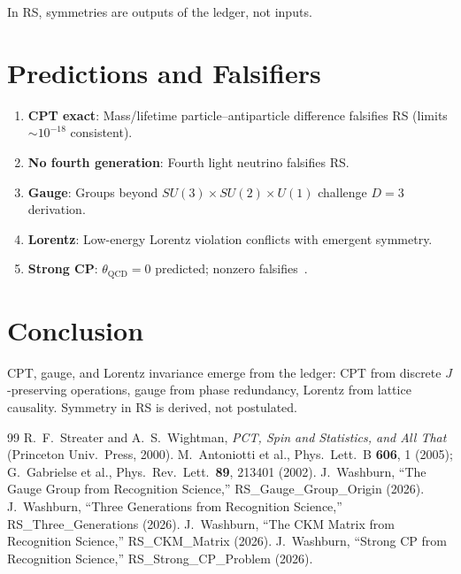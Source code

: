 \documentclass[12pt,a4paper]{article}
\theoremstyle{definition}
\theoremstyle{remark}
\begin{document}
In RS, symmetries are outputs of the ledger, not inputs.

\section{Predictions and Falsifiers}
\label{sec:predictions}

\begin{enumerate}[label=(\roman*)]
\item \textbf{CPT exact}: Mass/lifetime particle--antiparticle difference
  falsifies RS (limits $\sim 10^{-18}$ consistent).
\item \textbf{No fourth generation}: Fourth light neutrino falsifies RS.
\item \textbf{Gauge}: Groups beyond $SU(3)\times SU(2)\times U(1)$ challenge
  $D=3$ derivation.
\item \textbf{Lorentz}: Low-energy Lorentz violation conflicts with emergent
  symmetry.
\item \textbf{Strong CP}: $\theta_{\mathrm{QCD}} = 0$ predicted; nonzero
  falsifies~\cite{RSStrongCP}.
\end{enumerate}

\section{Conclusion}
\label{sec:conclusion}

CPT, gauge, and Lorentz invariance emerge from the ledger: CPT from discrete
$J$-preserving operations, gauge from phase redundancy, Lorentz from lattice
causality.  Symmetry in RS is derived, not postulated.

\begin{thebibliography}{99}
R.~F.~Streater and A.~S.~Wightman, \emph{PCT, Spin and Statistics, and All
That} (Princeton Univ.\ Press, 2000).
M.~Antoniotti et al., Phys.\ Lett.\ B \textbf{606}, 1 (2005); G.~Gabrielse
et al., Phys.\ Rev.\ Lett.\ \textbf{89}, 213401 (2002).
J.~Washburn, ``The Gauge Group from Recognition Science,'' RS\_Gauge\_Group\_Origin (2026).
J.~Washburn, ``Three Generations from Recognition Science,'' RS\_Three\_Generations (2026).
J.~Washburn, ``The CKM Matrix from Recognition Science,'' RS\_CKM\_Matrix (2026).
J.~Washburn, ``Strong CP from Recognition Science,'' RS\_Strong\_CP\_Problem (2026).
\end{thebibliography}
\end{document}

